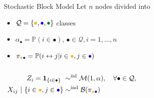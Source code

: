 \documentclass{beamer}\usepackage[]{graphicx}\usepackage[]{color}
\begin{document}
\begin{frame}
\begin{center}
\begin{overlayarea}{\textwidth}{.5\textheight}
\begin{columns}
\begin{column}{.45\paperwidth}
        \end{column}
        \begin{column}{.5\paperwidth}
          \begin{small}
            \begin{block}{Stochastic Block Model}
              Let $n$ nodes divided into
              \begin{itemize}
              \item
                $\mathcal{Q}=\{\textcolor{yellow!40!orange}{\bullet},\textcolor{blue!80!black}{\bullet},\textcolor{green!50!black}{\bullet}\}$
                classes
              \item  $\alpha_\bullet  =  \mathbb{P}(i  \in  \bullet)$,
                $\bullet\in\mathcal{Q},i=1,\dots,n$
              \item      $\pi_{\textcolor{yellow!40!orange}{\bullet}\textcolor{blue!80!black}{\bullet}}     =      \mathbb{P}(i
                \leftrightarrow j | i\in\textcolor{yellow!40!orange}{\bullet},j\in\textcolor{blue!80!black}{\bullet})$
              \end{itemize}
            \end{block}
          \end{small}
        \end{column}
      \end{columns}
    \end{overlayarea}
  \end{center}

  \begin{align*}
    Z_i = \mathbf{1}_{\{i \in \bullet\}}  \ & \sim^{\text{iid}} \mathcal{M}(1,\alpha), \quad \forall\bullet\in\mathcal{Q}, \\
    X_{ij} \ | \ \{i\in\textcolor{yellow!40!orange}{\bullet},j\in\textcolor{blue!80!black}{\bullet}\} & \sim^{\text{ind}} \mathcal{B}(\pi_{\textcolor{yellow!40!orange}{\bullet}\textcolor{blue!80!black}{\bullet}})\\
  \end{align*}

\end{frame}
\end{document}
